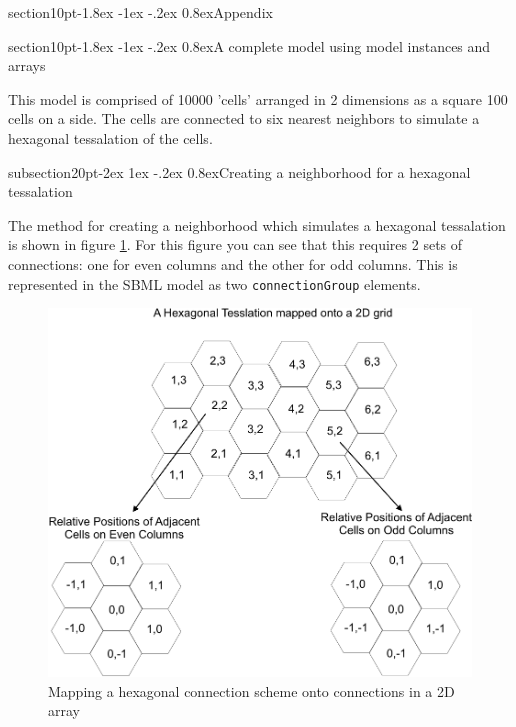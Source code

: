 \documentclass[10pt]{article}
\makeatletter
\renewcommand{\section}{\@startsection%
  {section}{1}{0pt}{-1.8ex \@plus -1ex \@minus -.2ex}%
  {0.8ex}{\normalfont\Large\bfseries\sffamily}}
\renewcommand{\subsection}{\@startsection%
  {subsection}{2}{0pt}{-2ex \@plus 1ex \@minus -.2ex}%
  {0.8ex}{\slshape\large\bfseries\sffamily}}
\newcommand{\class}[1]{\texttt{#1}}
\makeatother
\begin{document}
\setcounter{secnumdepth}{-1}
\section{Appendix}
\setcounter{secnumdepth}{2}
\appendix


\section{A complete model using model instances and arrays}

\label{sec:completeexample}

This model is comprised of 10000 'cells' arranged in 2 dimensions
as a square 100 cells on a side. The cells are connected to six
nearest neighbors to simulate a hexagonal tessalation of the
cells.

\subsection{Creating a neighborhood for a hexagonal tessalation}

The method for creating a neighborhood which simulates a
hexagonal tessalation is shown in figure \ref{fig:hexagon}.  For
this figure you can see that this requires 2 sets of connections:
one for even columns and the other for odd columns.  This is
represented in the SBML model as two \class{connectionGroup}
elements.

\begin{figure}

  \centering

  \includegraphics[scale = 0.75]{hexagon}

  \caption{Mapping a hexagonal connection scheme onto connections in a 2D array}

  \label{fig:hexagon}

\end{figure}
\end{document}
